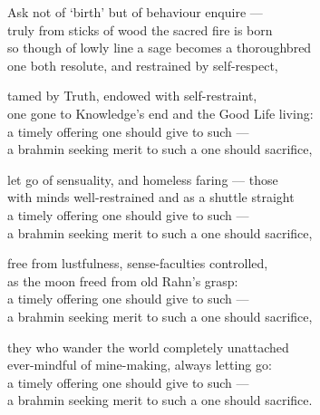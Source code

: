 \begin{MyDescription}{}
Ask not of `birth' but of behaviour enquire —\\
truly from sticks of wood the sacred fire is born\\
so though of lowly line a sage becomes a thoroughbred\\
one both resolute, and restrained by self-respect,
\end{MyDescription}

\begin{MyDescription}{}
tamed by Truth, endowed with self-restraint,\\
one gone to Knowledge's end and the Good Life living:\\
a timely offering one should give to such —\\
a brahmin seeking merit to such a one should sacrifice,
\end{MyDescription}

\begin{MyDescription}{}
let go of sensuality, and homeless faring — those\\
with minds well-restrained and as a shuttle straight\\
a timely offering one should give to such —\\
a brahmin seeking merit to such a one should sacrifice,
\end{MyDescription}

\begin{MyDescription}{}
free from lustfulness, sense-faculties controlled,\\
as the moon freed from old Rahn's grasp:\\
a timely offering one should give to such —\\
a brahmin seeking merit to such a one should sacrifice,
\end{MyDescription}

\begin{MyDescription}{}
they who wander the world completely unattached\\
ever-mindful of mine-making, always letting go:\\
a timely offering one should give to such —\\
a brahmin seeking merit to such a one should sacrifice.
\end{MyDescription}

